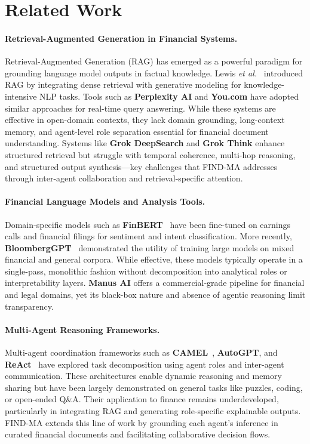 \documentclass[11pt]{article}
\newcommand{\findma}{\textsc{FIND-MA}}
\newcommand{\etal}{\textit{et al.}}
\begin{document}
\section{Related Work}
\label{sec:related}

\paragraph{Retrieval-Augmented Generation in Financial Systems.}
Retrieval-Augmented Generation (RAG) has emerged as a powerful paradigm for grounding language model outputs in factual knowledge. Lewis \etal~\cite{lewis2020retrieval} introduced RAG by integrating dense retrieval with generative modeling for knowledge-intensive NLP tasks. Tools such as \textbf{Perplexity AI} and \textbf{You.com} have adopted similar approaches for real-time query answering. While these systems are effective in open-domain contexts, they lack domain grounding, long-context memory, and agent-level role separation essential for financial document understanding. Systems like \textbf{Grok DeepSearch} and \textbf{Grok Think} enhance structured retrieval but struggle with temporal coherence, multi-hop reasoning, and structured output synthesis—key challenges that \findma{} addresses through inter-agent collaboration and retrieval-specific attention.

\paragraph{Financial Language Models and Analysis Tools.}
Domain-specific models such as \textbf{FinBERT}~\cite{araci2019finbert} have been fine-tuned on earnings calls and financial filings for sentiment and intent classification. More recently, \textbf{BloombergGPT}~\cite{wu2023bloomberggpt} demonstrated the utility of training large models on mixed financial and general corpora. While effective, these models typically operate in a single-pass, monolithic fashion without decomposition into analytical roles or interpretability layers. \textbf{Manus AI} offers a commercial-grade pipeline for financial and legal domains, yet its black-box nature and absence of agentic reasoning limit transparency.

\paragraph{Multi-Agent Reasoning Frameworks.}
Multi-agent coordination frameworks such as \textbf{CAMEL}~\cite{li2023camel}, \textbf{AutoGPT}, and \textbf{ReAct}~\cite{yao2023react} have explored task decomposition using agent roles and inter-agent communication. These architectures enable dynamic reasoning and memory sharing but have been largely demonstrated on general tasks like puzzles, coding, or open-ended Q\&A. Their application to finance remains underdeveloped, particularly in integrating RAG and generating role-specific explainable outputs. \findma{} extends this line of work by grounding each agent’s inference in curated financial documents and facilitating collaborative decision flows.
\end{document}
